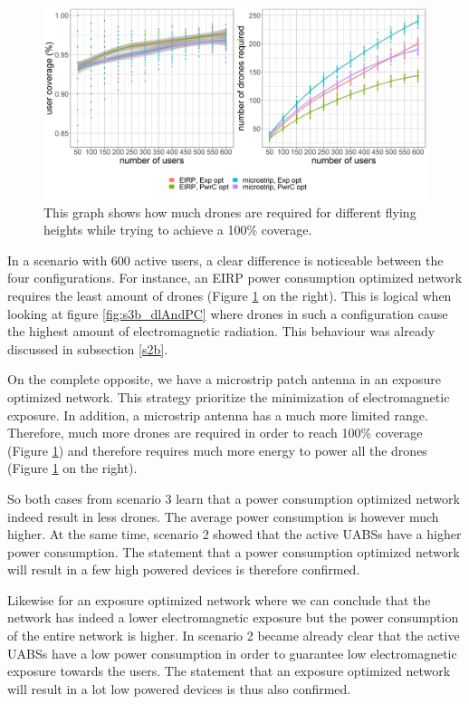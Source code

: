 \begin{figure}[h!]
  \includegraphics[width=\textwidth]{../results/s3/uvsnumdronesAndCov.png}
  \caption{This graph shows how much drones are required for different flying heights while trying to achieve a 100\% coverage.}
  \label{fig:s3b_numDronesAndCov}
\end{figure}

In a scenario with 600 active users, a clear difference is noticeable between the four configurations. 
For instance, an EIRP power consumption optimized 
network requires the least amount of drones (Figure \ref{fig:s3b_numDronesAndCov} on the right). This is logical when looking at figure \ref{fig:s3b_dlAndPC} where drones in such a configuration cause the highest amount of 
electromagnetic radiation. This behaviour was already discussed in subsection \ref{s2b}. 

On the complete opposite, we have a microstrip patch antenna in an exposure optimized network. 
This strategy prioritize the minimization of electromagnetic exposure. In addition, a microstrip antenna has a much more limited range.
Therefore, much more 
drones are required in order to reach 100\% coverage (Figure \ref{fig:s3b_numDronesAndCov}) and therefore requires much more energy 
to power all the drones (Figure \ref{fig:s3b_numDronesAndCov} on the right).

So both cases from  scenario 3 learn that a power consumption optimized network indeed result in less drones. The average power consumption 
is however much higher. At the same time, scenario 2 showed that the active \gls{UABS}s have a higher power consumption.
The statement that a power consumption optimized network will result in a few high powered devices is therefore confirmed.

Likewise for an exposure optimized network where we can conclude that the network has indeed a lower electromagnetic exposure but the power consumption 
of the entire network is higher. In scenario 2 became already clear that the active \gls{UABS}s have a low power consumption in order to 
guarantee low electromagnetic exposure towards the users.  The statement that an exposure optimized network will result in a lot low powered devices is thus also confirmed.

